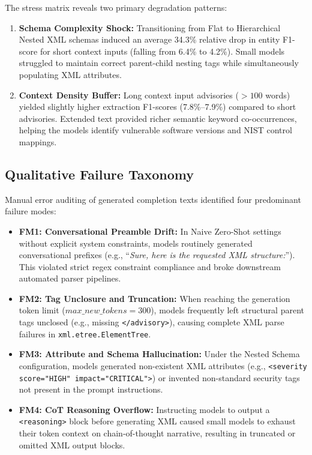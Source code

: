 \documentclass[11pt,a4paper]{article}
\begin{document}
The stress matrix reveals two primary degradation patterns:
\begin{enumerate}
    \item \textbf{Schema Complexity Shock:} Transitioning from Flat to Hierarchical Nested XML schemas induced an average 34.3\% relative drop in entity F1-score for short context inputs (falling from 6.4\% to 4.2\%). Small models struggled to maintain correct parent-child nesting tags while simultaneously populating XML attributes.
    \item \textbf{Context Density Buffer:} Long context input advisories ($>100$ words) yielded slightly higher extraction F1-scores (7.8\%--7.9\%) compared to short advisories. Extended text provided richer semantic keyword co-occurrences, helping the models identify vulnerable software versions and NIST control mappings.
\end{enumerate}

\subsection{Qualitative Failure Taxonomy}
Manual error auditing of generated completion texts identified four predominant failure modes:

\begin{itemize}
    \item \textbf{FM1: Conversational Preamble Drift:} In Naive Zero-Shot settings without explicit system constraints, models routinely generated conversational prefixes (e.g., ``\textit{Sure, here is the requested XML structure:}''). This violated strict regex constraint compliance and broke downstream automated parser pipelines.
    \item \textbf{FM2: Tag Unclosure and Truncation:} When reaching the generation token limit ($max\_new\_tokens = 300$), models frequently left structural parent tags unclosed (e.g., missing \texttt{</advisory>}), causing complete XML parse failures in \texttt{xml.etree.ElementTree}.
    \item \textbf{FM3: Attribute and Schema Hallucination:} Under the Nested Schema configuration, models generated non-existent XML attributes (e.g., \texttt{<severity score="HIGH" impact="CRITICAL">}) or invented non-standard security tags not present in the prompt instructions.
    \item \textbf{FM4: CoT Reasoning Overflow:} Instructing models to output a \texttt{<reasoning>} block before generating XML caused small models to exhaust their token context on chain-of-thought narrative, resulting in truncated or omitted XML output blocks.
\end{itemize}
\end{document}

